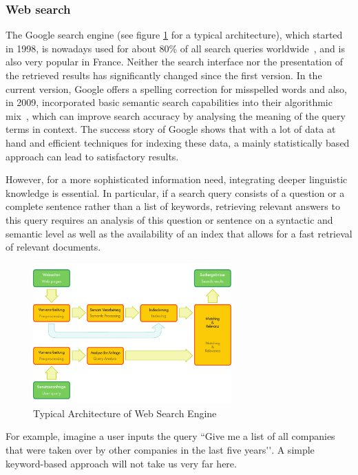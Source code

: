 \begin{multicols}{2}
\subsubsection{Web search}
The Google search engine (see figure \ref{fig:archiwebEn} for a
typical architecture), which started in 1998, is nowadays used for
about 80\% of all search queries worldwide~\cite{googleworld}, and is
also very popular in France. Neither the search interface nor the
presentation of the retrieved results has significantly changed since
the first version. In the current version, Google offers a spelling
correction for misspelled words and also, in 2009, incorporated basic
semantic search capabilities into their algorithmic mix~\cite{googlesemantics}, which can
improve search accuracy by analysing the meaning of the query terms in
context. The success story of Google shows that with a lot of data at
hand and efficient techniques for indexing these data, a mainly
statistically based approach can lead to satisfactory results.

However, for a more sophisticated information need, integrating deeper
linguistic knowledge is essential. In particular, if a search query
consists of a question or a complete sentence rather than a list of
keywords, retrieving relevant answers to this query requires an
analysis of this question or sentence on a syntactic and semantic
level as well as the availability of an index that allows for a fast
retrieval of relevant documents.

\begin{figure}[!ht]
\begin{center}
 \includegraphics[width=3.0in]{../_media/web_search_architecture}
 \caption{Typical Architecture of Web Search Engine}
\label{fig:archiwebEn}
\end{center}
\end{figure}

For example, imagine a user inputs the query ``Give me a list of all
companies that were taken over by other companies in the last five
years{\mbox '}{\mbox '}. A simple keyword-based approach will not take us very far
here.


\end{multicols}
